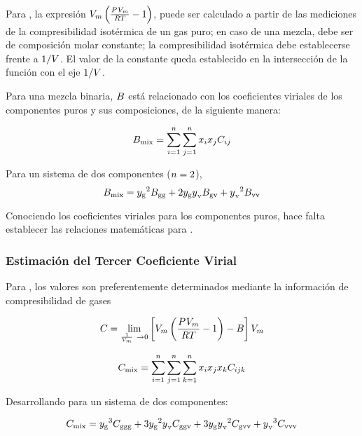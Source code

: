 Para \parencite[p. 473]{beattie1942second}, la expresión $V_m \left(\frac{P_{}^{}{}{} V_m} {R T} - 1 \right)$, puede ser calculado a partir de las mediciones de la compresibilidad isotérmica de un gas puro; en caso de una mezcla, debe ser de composición molar constante; la compresibilidad isotérmica debe establecerse frente a $1 / {V}$. El valor de la constante queda establecido en la intersección de la función con el eje $1/ {V}$.

Para una mezcla binaria, $B_{}$ está relacionado con los coeficientes viriales de los componentes puros y sus composiciones, de la siguiente manera:

\begin{equation}
   B_{\text{mix}}{} = \sum_{i=1}^{n} \sum_{j=1}^{n} x_i x_j C_{ij} {}
\end{equation}

Para un sistema de dos componentes ($n = 2$),
\begin{equation}
   B_{\text{mix}}{} = {{y_{{\text{g}}}}}^2 B_{{\text{g}} {\text{g}}} + 2 {{y_{{\text{g}}}}} {y_{}}_{{\text{v}}} B_{{\text{g}} {\text{v}}} + {{y_{}}_{{\text{v}}}}^2 B_{{\text{v}} {\text{v}}}{}
\end{equation}
\eqSecondVirialCoeffNaming{}

Conociendo los coeficientes viriales para los componentes puros, hace falta establecer las relaciones matemáticas para {\bCoeffVirial{\nameG \nameV}}.



\subsubsection{Estimación del Tercer Coeficiente Virial}
Para \parencite{Dymond2002}, los valores son preferentemente determinados mediante la información de compresibilidad de gases 

\begin{equation}
  C_{} = \lim_{\frac{1}{V_m}\ \to {0}} \left[ V_m \left(\frac{P_{}^{}{}{} V_m} {R T} - 1 \right) - B_{} \right] V_m
\end{equation}


\begin{equation}
   C_{\text{mix}}{} = \sum_{i=1}^{n} \sum_{j=1}^{n} \sum_{k=1}^{n} x_i x_j x_k C_{ijk} {}
\end{equation}

Desarrollando para un sistema de dos componentes:

\begin{equation}
   C_{\text{mix}}{} = {{y_{{\text{g}}}}}^3 C_{{\text{g}} {\text{g}} {\text{g}}} + 3{{y_{{\text{g}}}}}^2 {{y_{}}_{{\text{v}}}} C_{{\text{g}} {\text{g}} {\text{v}}} + 3 {{y_{{\text{g}}}}} {{y_{}}_{{\text{v}}}}^2 C_{{\text{g}} {\text{v}} {\text{v}}} + {{y_{}}_{{\text{v}}}}^3 C_{{\text{v}} {\text{v}} {\text{v}}}{}
\end{equation}

\eqThirdVirialCoeffNaming{}

